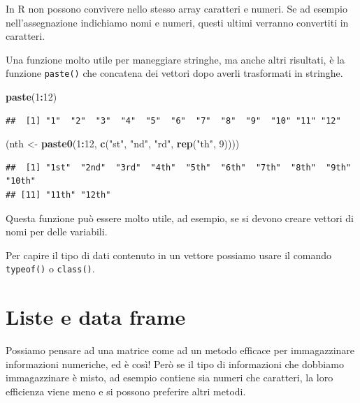 \documentclass[]{book}
\newenvironment{Shaded}{\begin{snugshade}}{\end{snugshade}}
\newcommand{\DecValTok}[1]{\textcolor[rgb]{0.00,0.00,0.81}{#1}}
\newcommand{\KeywordTok}[1]{\textcolor[rgb]{0.13,0.29,0.53}{\textbf{#1}}}
\newcommand{\NormalTok}[1]{#1}
\newcommand{\OperatorTok}[1]{\textcolor[rgb]{0.81,0.36,0.00}{\textbf{#1}}}
\newcommand{\StringTok}[1]{\textcolor[rgb]{0.31,0.60,0.02}{#1}}
\begin{document}
In R non possono convivere nello stesso array caratteri e numeri. Se ad esempio nell'assegnazione indichiamo nomi e numeri, questi ultimi verranno convertiti in caratteri.

Una funzione molto utile per maneggiare stringhe, ma anche altri risultati, è la funzione \texttt{paste()} che concatena dei vettori dopo averli trasformati in stringhe.

\begin{Shaded}
\begin{Highlighting}[]
\KeywordTok{paste}\NormalTok{(}\DecValTok{1}\OperatorTok{:}\DecValTok{12}\NormalTok{) }
\end{Highlighting}
\end{Shaded}

\begin{verbatim}
##  [1] "1"  "2"  "3"  "4"  "5"  "6"  "7"  "8"  "9"  "10" "11" "12"
\end{verbatim}

\begin{Shaded}
\begin{Highlighting}[]
\NormalTok{(nth <-}\StringTok{ }\KeywordTok{paste0}\NormalTok{(}\DecValTok{1}\OperatorTok{:}\DecValTok{12}\NormalTok{, }\KeywordTok{c}\NormalTok{(}\StringTok{"st"}\NormalTok{, }\StringTok{"nd"}\NormalTok{, }\StringTok{"rd"}\NormalTok{, }\KeywordTok{rep}\NormalTok{(}\StringTok{"th"}\NormalTok{, }\DecValTok{9}\NormalTok{))))}
\end{Highlighting}
\end{Shaded}

\begin{verbatim}
##  [1] "1st"  "2nd"  "3rd"  "4th"  "5th"  "6th"  "7th"  "8th"  "9th"  "10th"
## [11] "11th" "12th"
\end{verbatim}

Questa funzione può essere molto utile, ad esempio, se si devono creare vettori di nomi per delle variabili.

Per capire il tipo di dati contenuto in un vettore possiamo usare il comando \texttt{typeof()} o \texttt{class()}.

\hypertarget{liste-e-data-frame}{%
\section{Liste e data frame}\label{liste-e-data-frame}}

Possiamo pensare ad una matrice come ad un metodo efficace per immagazzinare informazioni numeriche, ed è così! Però se il tipo di informazioni che dobbiamo immagazzinare è misto, ad esempio contiene sia numeri che caratteri, la loro efficienza viene meno e si possono preferire altri metodi.
\end{document}
